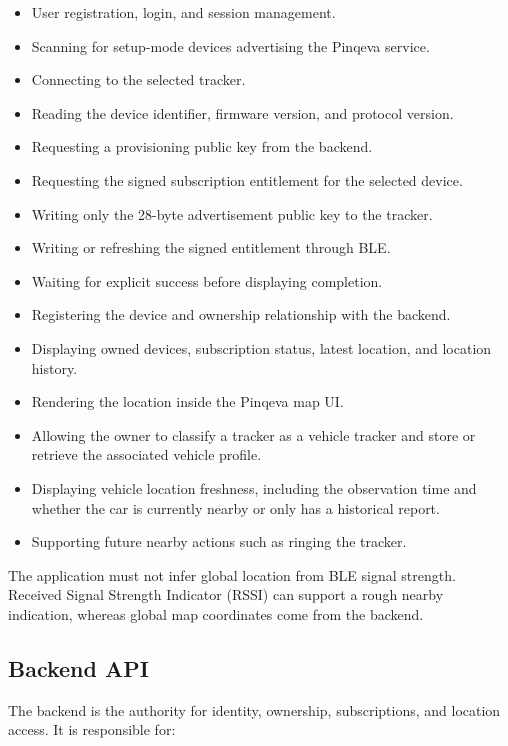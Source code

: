 \documentclass[12pt,a4paper]{article}
\begin{document}
\begin{itemize}
    \item User registration, login, and session management.
    \item Scanning for setup-mode devices advertising the Pinqeva service.
    \item Connecting to the selected tracker.
    \item Reading the device identifier, firmware version, and protocol version.
    \item Requesting a provisioning public key from the backend.
    \item Requesting the signed subscription entitlement for the selected
    device.
    \item Writing only the 28-byte advertisement public key to the tracker.
    \item Writing or refreshing the signed entitlement through BLE.
    \item Waiting for explicit success before displaying completion.
    \item Registering the device and ownership relationship with the backend.
    \item Displaying owned devices, subscription status, latest location, and
    location history.
    \item Rendering the location inside the Pinqeva map UI.
    \item Allowing the owner to classify a tracker as a vehicle tracker and
    store or retrieve the associated vehicle profile.
    \item Displaying vehicle location freshness, including the observation time
    and whether the car is currently nearby or only has a historical report.
    \item Supporting future nearby actions such as ringing the tracker.
\end{itemize}

The application must not infer global location from BLE signal strength.
Received Signal Strength Indicator (RSSI) can support a rough nearby indication,
whereas global map coordinates come from the backend.

\subsection{Backend API}

The backend is the authority for identity, ownership, subscriptions, and
location access. It is responsible for:
\end{document}
